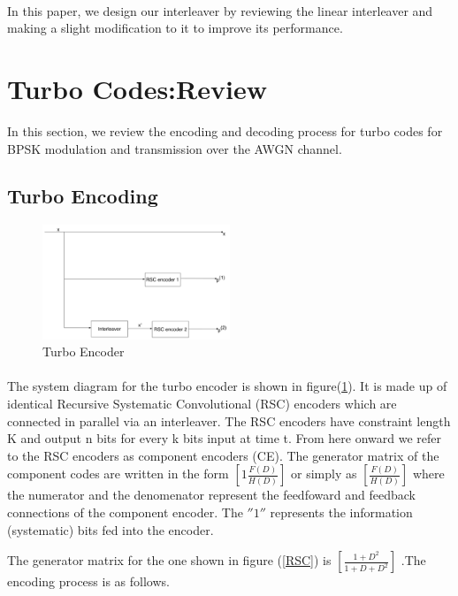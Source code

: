 \documentclass[twocolumn]{article}
\begin{document}
\paragraph{}
In this paper, we design our interleaver by reviewing the linear interleaver and making
a slight modification to it to improve its performance.

\section{Turbo Codes:Review}
In this section, we review the encoding and decoding process for turbo codes for BPSK
modulation and transmission over the AWGN channel.
	
\subsection{Turbo Encoding}

\begin{figure}[h!]
\centering
		\includegraphics[width=0.5\textwidth]{TurboEncoder.pdf}
		\caption{Turbo Encoder}
		\label{TC}
		\end{figure}
	
\paragraph{}The system diagram for the turbo encoder is shown in figure(\ref{TC}).
 It is made up of identical Recursive Systematic Convolutional (RSC) encoders which 
 are connected
  in parallel via an interleaver. The RSC encoders have constraint length K and output
  n bits for every k bits input at time t.
  From here onward we refer to the RSC encoders as component 
encoders (CE). The generator matrix of the component codes are written in 
the form $[1 \frac{F(D)}{H(D)}]$ or simply as $[\frac{F(D)}{H(D)}]$
where the numerator and the denomenator represent the feedfoward and feedback
 connections of the component encoder. The $''1''$ represents the information 
 (systematic) bits fed into the encoder.

 The generator matrix for the one shown in figure (\ref{RSC})
 is $[\frac{1+D^2}{1+D+D^2}]$ .The encoding process is as follows.
\end{document}
